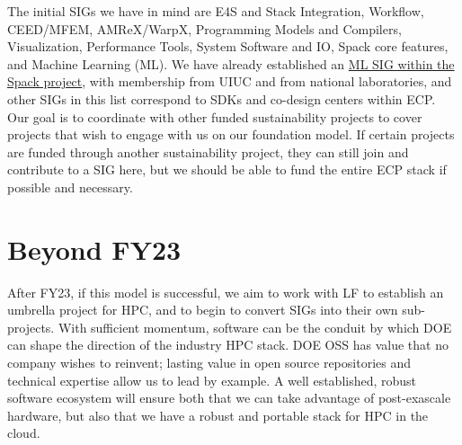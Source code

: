 \documentclass[11pt]{article}
\begin{document}
The initial SIGs we have in mind are E4S and Stack Integration, Workflow, CEED/MFEM,
AMReX/WarpX, Programming Models and Compilers, Visualization, Performance Tools, System
Software and IO, Spack core features, and Machine Learning (ML). We have already
established an \href{https://github.com/spack/spack/wiki/Machine-Learning-SIG}{ML SIG
  within the Spack project}, with membership from UIUC and from national laboratories,
and other SIGs in this list correspond to SDKs and co-design centers within ECP. Our goal is
to coordinate with other funded sustainability projects to cover projects that wish to
engage with us on our foundation model. If certain projects are funded through another
sustainability project, they can still join and contribute to a SIG here, but we should
be able to fund the entire ECP stack if possible and necessary.

\section{Beyond FY23}

After FY23, if this model is successful, we aim to work with LF to establish an umbrella
project for HPC, and to begin to convert SIGs into their own sub-projects. With
sufficient momentum, software can be the conduit by which DOE can shape the
direction of the industry HPC stack. DOE OSS has value that no company wishes to
reinvent; lasting value in open source repositories and technical expertise allow us to
lead by example. A well established, robust software ecosystem will ensure both that we
can take advantage of post-exascale hardware, but also that we have a robust and
portable stack for HPC in the cloud.




%
%  


\end{document}
